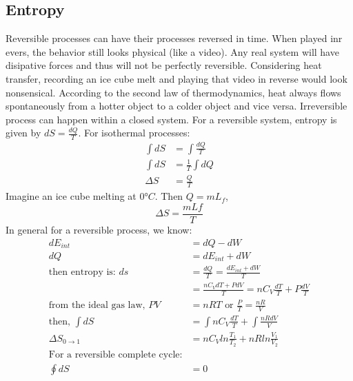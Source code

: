 	\subsection{Entropy}
	Reversible processes can have their processes reversed in time. When played inr evers, the behavior still looks physical (like a video). Any real system will have disipative forces and thus will not be perfectly reversible. Considering heat transfer, recording an ice cube melt and playing that video in reverse would look nonsensical. According to the second law of thermodynamics, heat always flows spontaneously from a hotter object to a colder object and vice versa. Irreversible process can happen within a closed system.
	\newline
	\newline
	For a reversible system, entropy is given by $dS=\frac{dQ}{T}$. For isothermal processes:
	\begin{align*}
	\int{dS}&=\int{\frac{dQ}{T}}\\
	\int{dS}&=\frac{1}{T}\int{dQ}\\
	\Delta S &= \frac{Q}{T}
	\end{align*}
	Imagine an ice cube melting at $0\si{\degree}C$. Then $Q=mL_f$,
	\begin{equation*}
	\Delta S =\frac{mLf}{T}
	\end{equation*}
	In general for a reversible process, we know:
	\begin{align*}
	dE_{int}&=dQ-dW\\
	dQ&=dE_{int}+dW\\
	\text{then entropy is: } ds&=\frac{dQ}{T}=\frac{dE_{int}+dW}{T}\\
	&=\frac{nC_VdT+PdV}{T}=nC_V\frac{dT}{T}+P\frac{dV}{T}\\
	\text{from the ideal gas law, } PV&=nRT \text{ or } \frac{P}{T}=\frac{nR}{V}\\
	\text{then, } \int{dS}&=\int{nC_V\frac{dT}{T}}+\int{\frac{nRdV}{V}}\\
	\Delta S_{0\to1}&=nC_Vln\frac{T_1}{T_2}+nRln\frac{V_1}{V_2}\\
	\text{For a reversible complete cycle:}\\
	\oint dS&=0
	\end{align*}	
\newpage